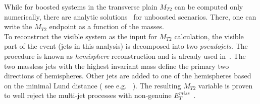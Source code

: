 While for boosted systems in the transverse plain $M_{T2}$ can be computed only numerically, there are analytic solutions~\cite{Cho:2007dh} for unboosted scenarios. There, one can write the $M_{T2}$ endpoint as a function of the masses. \\
To reconstruct the visible system as the input for $M_{T2}$ calculation, the visible part of the event (jets in this analysis) is decomposed into two \textit{pseudojets}. The procedure is known as \textit{hemisphere} reconstruction and is already used in~\cite{CMS-PAS-SUS-12-002}. The two massless jets with the highest invariant mass define the primary two directions of hemispheres. Other jets are added to one of the hemispheres based on the minimal Lund distance ( see e.g. ~\cite{Sjostrand:2006za}). The resulting $M_{T2}$ variable is proven to well reject the multi-jet processes with non-genuine $E_{T}^{miss}$~\cite{CMS-PAS-SUS-12-002}. \\
